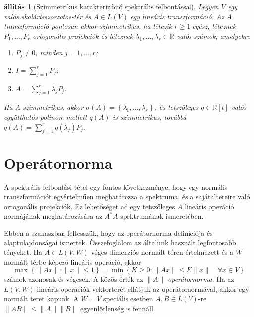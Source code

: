 \documentclass[a4paper, showtrims]{memoir}
\theoremstyle{plain}
\newtheorem{proposition}{állítás}[chapter]
\theoremstyle{remark}
\theoremstyle{definition}
\begin{document}
\begin{proposition}[Szimmetrikus karakterizáció spektrális felbontással]
	Legyen $V$ egy valós ska\-lá\-ris\-szor\-za\-tos-tér
	és $A\in L\left( V \right)$ egy lineáris transzformáció.
	Az $A$ transzformáció pontosan akkor szimmetrikus,
	ha létezik $r\geq 1$ egész, léteznek $P_1,\ldots,P_r$ ortogonális projekciók és
	léteznek $\lambda_1,\ldots,\lambda_r\in\mathbb{R}$ valós számok,
	amelyekre
	\begin{enumerate}
		\item $P_j\neq 0$, minden $j=1,\ldots,r$;
		\item $I=\sum_{j=1}^rP_j$;
		\item $A=\sum_{j=1}^r\lambda_jP_j$.
	\end{enumerate}
	Ha $A$ szimmetrikus,
	akkor $\sigma\left( A \right)=\left\{ \lambda_1,\ldots,\lambda_r \right\}$,
	és tetszőleges $q\in\mathbb{R}[t]$ valós együtthatós polinom mellett
	$q\left( A \right)$ is szimmetrikus,
	továbbá
	$q\left( A \right)=\sum_{j=1}^rq\left( \lambda_j \right)P_j$.
\end{proposition}




\section{Operátornorma}
A spektrális felbontási tétel egy fontos következménye,
hogy egy normális transzformációt egyértelműen meghatározza a spektruma, és a sajátaltereire való
ortogonális projekciók.
Ez lehetőséget ad egy tetszőleges $A$ lineáris operáció normájának meghatározására az $A^\ast A$ spektrumának ismeretében.

Ebben a szakaszban feltesszük,
hogy az operátornorma definíciója és alaptulajdonságai ismertek.
Összefoglalom az általunk használt legfontosabb tényeket.
Ha $A\in L\left( V,W \right)$ véges dimenziós normált téren értelmezett és a $W$ normált térbe képező lineáris operáció,
akkor
\[
	\max\left\{ \|Ax\|:\|x\|\leq 1 \right\}
	=
	\min\left\{ K\geq 0:\|Ax\|\leq K\|x\|\quad\forall x\in V \right\}
\]
számok azonosak és végesek. A közös érték az $\|A\|$ \emph{operátornorma}.
Ha az $L\left( V,W \right)$ lineáris operációk vektorterét ellátjuk az operátornormával,
akkor egy normált teret kapunk.
A $W=V$ speciális esetben $A,B\in L\left( V \right)$-re $\|AB\|\leq \|A\|\|B\|$ egyenlőtlenség is fennáll.
\end{document}
